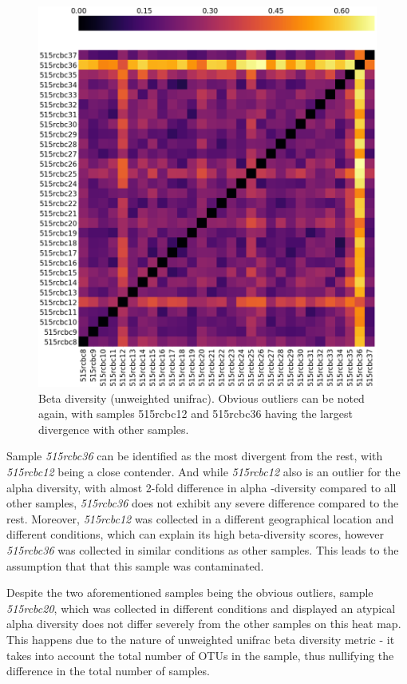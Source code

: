 \documentclass[12pt,twocolumn]{article}
\begin{document}
\begin{figure}[ht!] %
	\includegraphics[width=\linewidth]{unweighted_beta.png}
	\caption{Beta diversity (unweighted unifrac). Obvious outliers can be noted again, with samples 515rcbc12 and 515rcbc36 having the largest divergence with other samples.}
	\label{fig:beta_diversity}
\end{figure}
\par
 Sample \textit{515rcbc36} can be identified as the most divergent from the rest, with \textit{515rcbc12} being a close contender. And while \textit{515rcbc12} also is an outlier for the alpha diversity, with almost 2-fold difference in alpha -diversity compared to all other samples, \textit{515rcbc36} does not exhibit any severe difference compared to the rest. Moreover, \textit{515rcbc12} was collected in a different geographical location and different conditions, which can explain its high beta-diversity scores, however \textit{515rcbc36} was collected in similar conditions as other samples. This leads to the assumption that that this sample was contaminated.
\par
Despite the two aforementioned samples being the obvious outliers, sample \textit{515rcbc20}, which was collected in different conditions and displayed an atypical alpha diversity does not differ severely from the other samples on this heat map. This happens due to the nature of unweighted unifrac beta diversity metric - it takes into account the total number of OTUs in the sample, thus nullifying the difference in the total number of samples.
\end{document}
